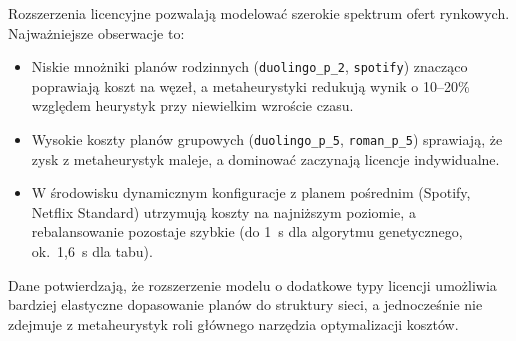Rozszerzenia licencyjne pozwalają modelować szerokie spektrum ofert rynkowych. Najważniejsze obserwacje to:
\begin{itemize}
  \item Niskie mnożniki planów rodzinnych (\texttt{duolingo\_p\_2}, \texttt{spotify}) znacząco poprawiają koszt na węzeł, a metaheurystyki redukują wynik o 10--20\% względem heurystyk przy niewielkim wzroście czasu.
  \item Wysokie koszty planów grupowych (\texttt{duolingo\_p\_5}, \texttt{roman\_p\_5}) sprawiają, że zysk z metaheurystyk maleje, a dominować zaczynają licencje indywidualne.
  \item W środowisku dynamicznym konfiguracje z planem pośrednim (Spotify, Netflix Standard) utrzymują koszty na najniższym poziomie, a rebalansowanie pozostaje szybkie (do 1~s dla algorytmu genetycznego, ok.~1,6~s dla tabu).
\end{itemize}

Dane potwierdzają, że rozszerzenie modelu o dodatkowe typy licencji umożliwia bardziej elastyczne dopasowanie planów do struktury sieci, a jednocześnie nie zdejmuje z metaheurystyk roli głównego narzędzia optymalizacji kosztów.
